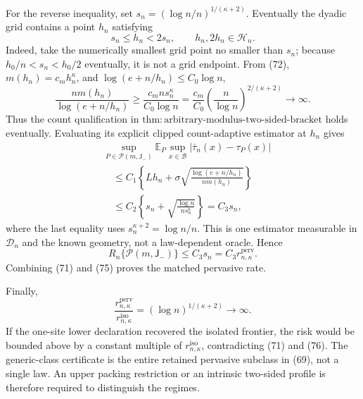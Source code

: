 For the reverse inequality, set
\(s_n=(\log n/n)^{1/(\kappa+2)}\).  Eventually the dyadic grid contains
a point \(h_n\) satisfying
\[
 s_n\le h_n<2s_n,
 \qquad h_n,2h_n\in\mathcal H_n.
 \tag{72}
\]
Indeed, take the numerically smallest grid point no smaller than \(s_n\);
because \(h_0/n<s_n<h_0/2\) eventually, it is not a grid endpoint.  From
(72), \(m(h_n)=c_mh_n^\kappa\), and
\(\log(e+n/h_n)\le C_0\log n\),
\[
 \frac{nm(h_n)}{\log(e+n/h_n)}
 \ge\frac{c_mns_n^\kappa}{C_0\log n}
 =\frac{c_m}{C_0}
 \left(\frac n{\log n}\right)^{2/(\kappa+2)}
 \longrightarrow\infty.
 \tag{73}
\]
Thus the count qualification in
\(\mathrm{thm:arbitrary\text{-}modulus\text{-}two\text{-}sided\text{-}bracket}\)
holds eventually.  Evaluating its explicit clipped count-adaptive
estimator at \(h_n\) gives
\[
 \begin{aligned}
 &\sup_{P\in\mathcal P(m,\mathsf J_{-})}
 \mathbb E_P\sup_{x\in\mathcal B}
 |\overline\tau_n(x)-\tau_P(x)|\\
 &\quad\le C_1\left\{Lh_n+
 \sigma\sqrt{\frac{\log(e+n/h_n)}{nm(h_n)}}\right\}\\
 &\quad\le C_2\left\{s_n+
 \sqrt{\frac{\log n}{ns_n^\kappa}}\right\}
 =C_3s_n,
 \end{aligned}
 \tag{74}
\]
where the last equality uses \(s_n^{\kappa+2}=\log n/n\).  This is one
estimator measurable in \(\mathcal D_n\) and the known geometry, not a
law-dependent oracle.  Hence
\[
 R_n\{\mathcal P(m,\mathsf J_{-})\}
 \le C_3s_n=C_3r_{n,\kappa}^{\mathrm{perv}}.
 \tag{75}
\]
Combining (71) and (75) proves the matched pervasive rate.

Finally,
\[
 \frac{r_{n,\kappa}^{\mathrm{perv}}}{r_{n,\kappa}^{\mathrm{iso}}}
 =(\log n)^{1/(\kappa+2)}\longrightarrow\infty.
 \tag{76}
\]
If the one-site lower declaration recovered the isolated frontier, the
risk would be bounded above by a constant multiple of
\(r_{n,\kappa}^{\mathrm{iso}}\), contradicting (71) and (76).  The
generic-class certificate is the entire retained pervasive subclass in
(69), not a single law.  An upper packing restriction or an intrinsic
two-sided profile is therefore required to distinguish the regimes.